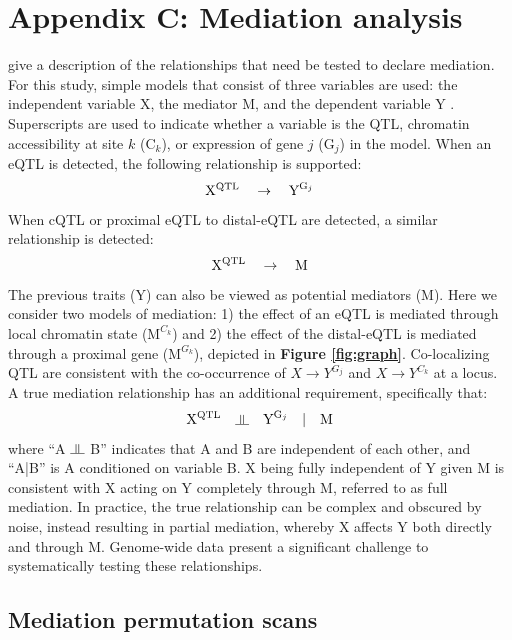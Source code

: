 \documentclass[9pt,twocolumn,twoside]{gsajnl}
\newcommand{\indep}{\rotatebox[origin=c]{90}{$\models$}}
\begin{document}
\section{Appendix C: Mediation analysis}

\cite{Baron1986} give a description of the relationships that need be tested to declare mediation. For this study, simple models that consist of three variables are used: the independent variable X, the mediator M, and the dependent variable Y \citep{MacKinnon2007}. Superscripts are used to indicate whether a variable is the QTL, chromatin accessibility at site $k$ ($\text{C}_{k}$), or expression of gene $j$ ($\text{G}_{j}$) in the model. When an eQTL is detected, the following relationship is supported:
\begin{equation}
\text{X}\textsuperscript{QTL} \quad \rightarrow \quad \text{Y}^{\text{G}_{j}}
\label{rel:eQTL}
\end{equation}
When cQTL or proximal eQTL to distal-eQTL are detected, a similar relationship is detected:
\begin{equation}
\text{X}\textsuperscript{QTL} \quad \rightarrow \quad \text{M}
\label{rel:cQTL}
\end{equation}
The previous traits (Y) can also be viewed as potential mediators (M). Here we consider two models of mediation: 1) the effect of an eQTL is mediated through local chromatin state ($\text{M}^{C_{k}}$) and 2) the effect of the distal-eQTL is mediated through a proximal gene ($\text{M}^{G_{k}}$), depicted in \textbf{Figure \ref{fig:graph}}. Co-localizing QTL are consistent with the co-occurrence of $X \rightarrow Y^{G_{j}}$ and $X \rightarrow Y^{C_{k}}$ at a locus. A true mediation relationship has an additional requirement, specifically that: 
\begin{equation}
\text{X}\textsuperscript{QTL} \quad \indep \quad \text{Y}^{\text{G}_{j}} \quad | \quad \text{M}
\label{rel:full_mediator}
\end{equation}
where ``A $\indep$ B'' indicates that A and B are independent of each other, and ``A|B'' is A conditioned on variable B. X being fully independent of Y given M is consistent with X acting on Y completely through M, referred to as full mediation. In practice, the true relationship can be complex and obscured by noise, instead resulting in partial mediation, whereby X affects Y both directly and through M. Genome-wide data present a significant challenge to systematically testing these relationships.

\subsection{Mediation permutation scans}
\end{document}
